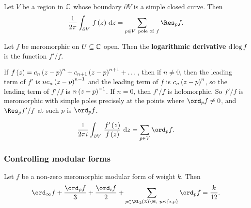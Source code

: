 \begin{theorem}
Let $ V $ be a region in $ \mathbb{C} $ whose boundary $ \partial V $ is a simple closed curve. Then
$$ \dfrac{1}{2\pi}\intd{\partial V}{}{f\br{z}}{z} = \sum_{p \in V \ \text{pole of} \ f} \Res_p f. $$
\end{theorem}

\begin{definition}
Let $ f $ be meromorphic on $ U \subseteq \mathbb{C} $ open. Then the \textbf{logarithmic derivative} $ \mathrm{d}\log f $ is the function $ f' / f $.
\end{definition}

If $ f\br{z} = c_n\br{z - p}^n + c_{n + 1}\br{z - p}^{n + 1} + \dots $, then if $ n \ne 0 $, then the leading term of $ f' $ is $ nc_n\br{z - p}^{n - 1} $ and the leading term of $ f $ is $ c_n\br{z - p}^n $, so the leading term of $ f' / f $ is $ n\br{z - p}^{-1} $. If $ n = 0 $, then $ f' / f $ is holomorphic. So $ f' / f $ is meromorphic with simple poles precisely at the points where $ \ord_p f \ne 0 $, and $ \Res_p f' / f $ at such $ p $ is $ \ord_p f $.

\begin{theorem}
$$ \dfrac{1}{2\pi i}\intd{\partial V}{}{\dfrac{f'\br{z}}{f\br{z}}}{z} = \sum_{p \in V} \ord_p f. $$
\end{theorem}

\pagebreak

\subsubsection{Controlling modular forms}

\begin{theorem}[$ k / 12 $-formula]
Let $ f $ be a non-zero meromorphic modular form of weight $ k $. Then
$$ \ord_\infty f + \dfrac{\ord_\rho f}{3} + \dfrac{\ord_i f}{2} + \sum_{p \in \SL_2\br{\ZZ} \backslash \HH, \ p \nsim \cbr{i, \rho}} \ord_p f = \dfrac{k}{12}. $$
\end{theorem}


